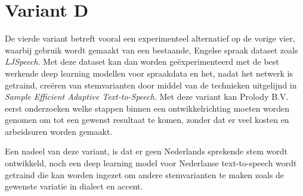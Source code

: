 \section{Variant D}
De vierde variant betreft vooral een experimenteel alternatief op de vorige vier, waarbij gebruik wordt gemaakt van een bestaande, Engelse spraak dataset zoals \textit{LJSpeech}. Met deze dataset kan dan worden geëxperimenteerd met de best werkende deep learning modellen voor spraakdata en het, nadat het netwerk is getraind, creëren van stemvarianten door middel van de technieken uitgelijnd in \textit{Sample Efficient Adaptive Text-to-Speech}. Met deze variant kan Prolody B.V. eerst onderzoeken welke stappen binnen een ontwikkelrichting moeten worden genomen om tot een gewenst resultaat te komen, zonder dat er veel kosten en arbeidsuren worden gemaakt.

Een nadeel van deze variant, is dat er geen Nederlands sprekende stem wordt ontwikkeld, noch een deep learning model voor Nederlanse text-to-speech wordt getraind die kan worden ingezet om andere stemvarianten te maken zoals de gewenste variatie in dialect en accent.